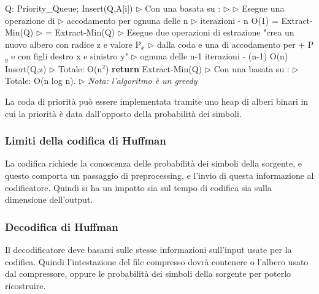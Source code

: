 \begin{algorithm}
\caption*{(A: array; n: intero)}
\begin{algorithmic}[1]
\State Q: Priority\_Queue;
\State 
{}
    \State Insert(Q,A[i]) \hfill $\triangleright$ Con una  basata su :
\EndFor
\State \hfill $\triangleright$ 
\State \hfill $\triangleright$ Esegue una operazione di 
\State \hfill $\triangleright$ accodamento per ognuna delle n
\State \hfill $\triangleright$ iterazioni - n O(1)
\State
{}
    \State {} = Extract-Min(Q) \hfill $\triangleright$ 
    \State {} = Extract-Min(Q) \hfill $\triangleright$ Esegue due operazioni di estrazione
    \State "crea un nuovo albero con radice z e valore P$_x$ \hfill $\triangleright$ dalla coda e una di accodamento per
    \State + P$_y$ e con figli destro x e sinistro y" \hfill $\triangleright$ ognuna delle n-1 iterazioni - (n-1) O(n)
    \State Insert(Q,z) \hfill $\triangleright$ Totale: O(n$^2$)
\EndFor
\State
\State \textbf{return} Extract-Min(Q) \hfill $\triangleright$ Con una  basata su :
\State \hfill $\triangleright$ Totale: O(n log n).
\State
\State \hfill $\triangleright$ \textit{Nota: l'algoritmo è un greedy}
\end{algorithmic}
\end{algorithm}

La coda di priorità può essere implementata tramite uno heap di alberi binari in cui la priorità è data dall'opposto della probabilità dei simboli.



\subsubsection{Limiti della codifica di Huffman}
La codifica richiede la conoscenza delle probabilità dei simboli della sorgente, e questo comporta un passaggio di preprocessing, e l'invio di questa informazione al codificatore. Quindi si ha un impatto sia sul tempo di codifica sia sulla dimensione dell'output.

\subsubsection{Decodifica di Huffman}
Il decodificatore deve basarsi sulle stesse informazioni sull'input usate per la codifica. Quindi l'intestazione del file compresso dovrà contenere o l'albero usato dal compressore, oppure le probabilità dei simboli della sorgente per poterlo ricostruire.

